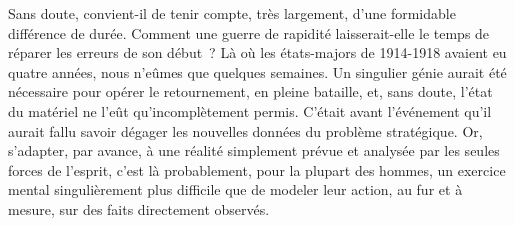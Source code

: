 \documentclass[french,twoside]{book} %
\begin{document}
Sans doute, convient-il de tenir compte, très largement, d’une formidable différence de durée. Comment une guerre de rapidité laisserait-elle le temps de réparer les erreurs de son début ? Là où les états-majors de 1914-1918 avaient eu quatre années, nous n’eûmes que quelques semaines. Un singulier génie aurait été nécessaire pour opérer le retournement, en pleine bataille, et, sans doute, l’état du matériel ne l’eût qu’incomplètement permis. C’était avant l’événement qu’il aurait fallu savoir dégager les   nouvelles données du problème stratégique. Or, s’adapter, par avance, à une réalité simplement prévue et analysée par les seules forces de l’esprit, c’est là probablement, pour la plupart des hommes, un exercice mental singulièrement plus difficile que de modeler leur action, au fur et à mesure, sur des faits directement observés.\par
\end{document}
